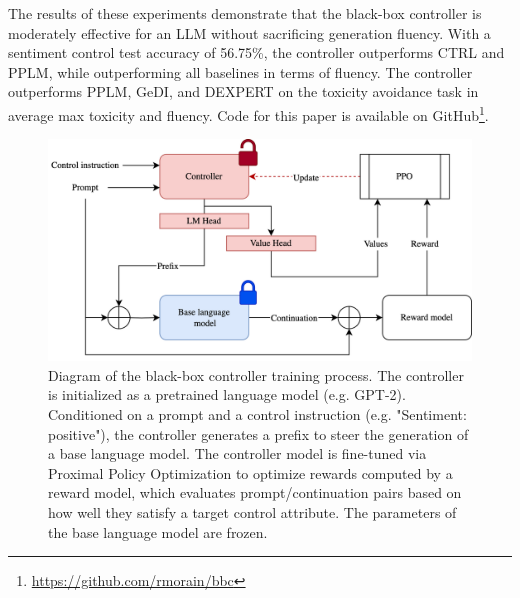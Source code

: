\documentclass[phd,electronic,oneside,twosidetoc,letterpaper,chaptercenter,parttop,lof]{byumsphd}
\def\sentimentcontroltestaccuracy{56.75\%}
\begin{document}
The results of these experiments demonstrate that the black-box controller is moderately effective for an LLM without sacrificing generation fluency.
With a sentiment control test accuracy of \sentimentcontroltestaccuracy{}, the controller outperforms CTRL and PPLM, while outperforming all baselines in terms of fluency.
The controller outperforms PPLM, GeDI, and DEXPERT on the toxicity avoidance task in average max toxicity and fluency.
Code for this paper is available on GitHub\footnote{\url{https://github.com/rmorain/bbc}}.



\begin{figure}[t!]
    \centering
    \includegraphics[width=\linewidth]{images/bbc/system_diagram_value_head.png}\vspace{-10pt}
    \caption[System diagram with value head]{Diagram of the black-box controller training process. The controller is initialized as a pretrained language model (e.g. GPT-2). Conditioned on a prompt and a control instruction (e.g. "Sentiment: positive"), the controller generates a prefix to steer the generation of a base language model. The controller model is fine-tuned via Proximal Policy Optimization to optimize rewards computed by a reward model, which evaluates prompt/continuation pairs based on how well they satisfy a target control attribute. The parameters of the base language model are frozen.}
    \label{fig:system_diagram}
\end{figure}
\end{document}
